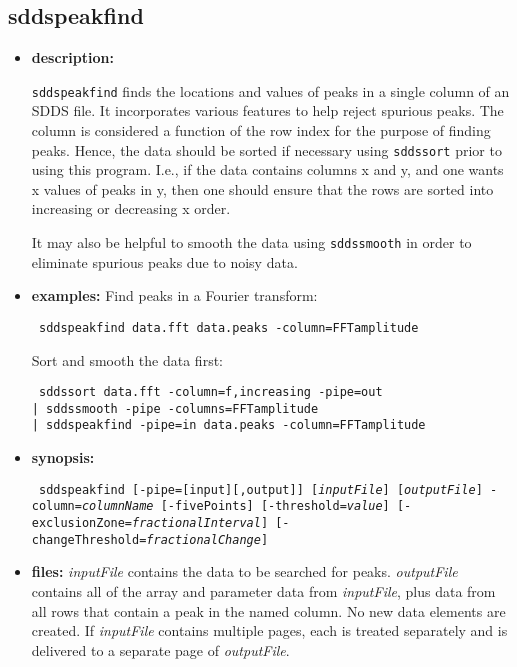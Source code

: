 \newpage
\subsection{sddspeakfind}
\label{sddspeakfind}

\begin{itemize}
\item {\bf description:}

{\tt sddspeakfind} finds the locations and values of peaks in a single column of an SDDS file.  It incorporates
various features to help reject spurious peaks.  The column is considered a function of the row index for the
purpose of finding peaks.  Hence, the data should be sorted if necessary using {\tt sddssort} prior to using this
program.  I.e., if the data contains columns x and y, and one wants x values of peaks in y, then one should
ensure that the rows are sorted into increasing or decreasing x order.

It may also be helpful to smooth the data using {\tt sddssmooth} in order to eliminate spurious peaks due to
noisy data.

\item {\bf examples:} 
Find peaks in a Fourier transform:
\begin{flushleft}{\tt
sddspeakfind data.fft data.peaks -column=FFTamplitude 
}\end{flushleft}
Sort and smooth the data first:
\begin{flushleft}{\tt
sddssort data.fft -column=f,increasing -pipe=out \\
| sddssmooth -pipe -columns=FFTamplitude \\
| sddspeakfind -pipe=in data.peaks -column=FFTamplitude 
}\end{flushleft}

\item {\bf synopsis:} 
\begin{flushleft}{\tt
sddspeakfind [-pipe=[input][,output]] [{\em inputFile}] [{\em outputFile}] 
-column={\em columnName} [-fivePoints] [-threshold={\em value}]
[-exclusionZone={\em fractionalInterval}] [-changeThreshold={\em fractionalChange}]
}\end{flushleft}
\item {\bf files:}
{\em inputFile} contains the data to be searched for peaks.  {\em outputFile} contains all of the array and
parameter data from {\em inputFile}, plus data from all rows that contain a peak in the named column.  No new
data elements are created.  If {\em inputFile} contains multiple pages, each is treated separately and is
delivered to a separate page of {\em outputFile}.


\end{itemize}
